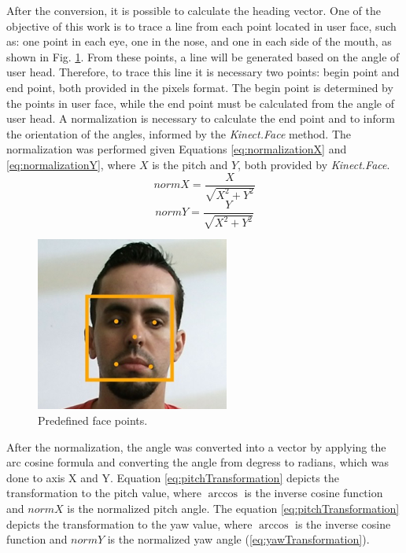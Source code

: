 \documentclass[10pt, conference]{IEEEtran}
\begin{document}
	After the conversion, it is possible to calculate the heading vector. 
	One of the objective of this work is to trace a line from each point located in user face, such as: one point in each eye, one in the nose, and one in each side of the mouth, as shown in Fig. \ref{fig:fig5}. 
	From these points, a line will be generated based on the angle of user head. 
	Therefore, to trace this line it is necessary two points: begin point and end point, both provided in the pixels format. 
	The begin point is determined by the points in user face, while the end point must be calculated from the angle of user head. 
	A normalization is necessary to calculate the end point and to inform the orientation of the angles, informed by the \emph{Kinect.Face} method. 
	The normalization was performed given Equations \ref{eq:normalizationX} and \ref{eq:normalizationY}, where $X$ is the pitch and $Y$, both provided by \emph{Kinect.Face}.
    \begin{equation}
    	normX = \frac{X}{\sqrt{X^2 + Y^2}}
		\label{eq:normalizationX}
	\end{equation}
    \begin{equation}
    	normY = \frac{Y}{\sqrt{X^2 + Y^2}}    
		\label{eq:normalizationY}
	\end{equation}

    \begin{figure}[t]
        \centering
        \includegraphics{figures/pic5.png}
        \caption{Predefined face points.}
        \label{fig:fig5}
    \end{figure}

	After the normalization, the angle was converted into a vector by applying the arc cosine formula and converting the angle from degress to radians, which was done to axis X and Y.
	Equation \ref{eq:pitchTransformation} depicts the transformation to the pitch value, where $\arccos$ is the inverse cosine function and $normX$ is the normalized pitch angle. The equation \ref{eq:pitchTransformation} depicts the transformation to the yaw value, where $\arccos$ is the inverse cosine function and $normY$ is the normalized yaw angle (\ref{eq:yawTransformation}).
\end{document}
